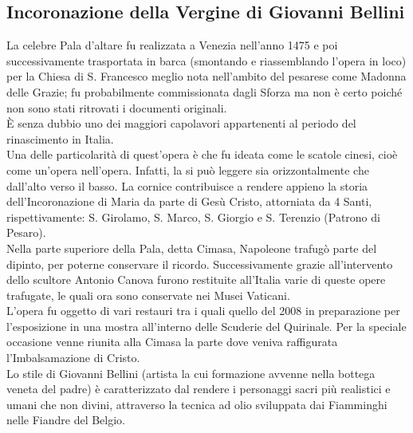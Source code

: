 \documentclass[12pt,a4paper]{article}
\begin{document}
	\subsection{Incoronazione della Vergine di Giovanni Bellini}
	La celebre Pala d'altare fu realizzata a Venezia nell'anno 1475 e poi successivamente trasportata in barca (smontando e riassemblando l'opera in loco) per la Chiesa di S. Francesco meglio nota nell'ambito del pesarese come Madonna delle Grazie; fu probabilmente commissionata dagli Sforza ma non è certo poiché non sono stati ritrovati i documenti originali.\\
	È senza dubbio uno dei maggiori capolavori appartenenti al periodo del rinascimento in Italia.\\
	Una delle particolarità di quest'opera è che fu ideata come le scatole cinesi, cioè come un’opera nell'opera. Infatti, la si può leggere sia orizzontalmente che dall'alto verso il basso. La cornice contribuisce a rendere appieno la storia dell'Incoronazione di Maria da parte di Gesù Cristo, attorniata da 4 Santi, rispettivamente: S. Girolamo, S. Marco, S. Giorgio e S. Terenzio (Patrono di Pesaro). \\
	Nella parte superiore della Pala, detta Cimasa, Napoleone trafugò parte del dipinto, per poterne conservare il ricordo. Successivamente grazie all'intervento dello scultore Antonio Canova furono restituite all'Italia varie di queste opere trafugate, le quali ora sono conservate nei Musei Vaticani.\\
	L'opera fu oggetto di vari restauri tra i quali quello del 2008 in preparazione per l'esposizione in una mostra all'interno delle Scuderie del Quirinale. Per la speciale occasione venne riunita alla Cimasa la parte dove veniva raffigurata l’Imbalsamazione di Cristo.\\
	Lo stile di Giovanni Bellini (artista la cui formazione avvenne nella bottega veneta del padre)  è caratterizzato dal rendere i personaggi sacri più realistici e umani che non divini, attraverso la tecnica ad olio sviluppata dai Fiamminghi nelle Fiandre del Belgio.
	
\end{document}
